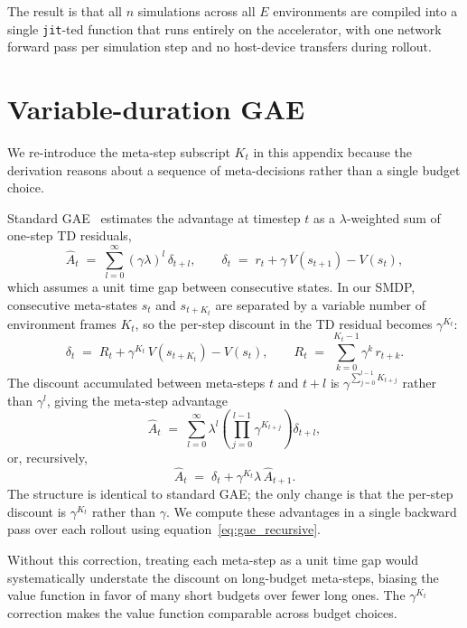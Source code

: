 \documentclass{article}
\begin{document}
The result is that all $n$ simulations across all $E$ environments are
compiled into a single \texttt{jit}-ted function that runs entirely on
the accelerator, with one network forward pass per simulation step and
no host-device transfers during rollout.

\section{Variable-duration GAE}
\label{app:gae}

We re-introduce the meta-step subscript $K_t$ in this appendix because the
derivation reasons about a sequence of meta-decisions rather than a single
budget choice.

Standard GAE~\citep{schulman2015high} estimates the advantage at
timestep $t$ as a $\lambda$-weighted sum of one-step TD residuals,
\begin{equation}
  \hat{A}_t \;=\; \sum_{l=0}^{\infty} (\gamma \lambda)^l\, \delta_{t+l},
  \qquad
  \delta_t \;=\; r_t + \gamma\, V(s_{t+1}) - V(s_t),
\end{equation}
which assumes a unit time gap between consecutive states.
In our SMDP, consecutive meta-states $s_t$ and $s_{t + K_t}$ are
separated by a variable number of environment frames $K_t$, so the
per-step discount in the TD residual becomes $\gamma^{K_t}$:
\begin{equation}
  \delta_t \;=\; R_t + \gamma^{K_t}\, V(s_{t + K_t}) - V(s_t),
  \qquad
  R_t \;=\; \sum_{k=0}^{K_t - 1} \gamma^k\, r_{t+k}.
\end{equation}
The discount accumulated between meta-steps $t$ and $t+l$ is
$\gamma^{\sum_{j=0}^{l-1} K_{t+j}}$ rather than $\gamma^l$, giving the
meta-step advantage
\begin{equation}
  \hat{A}_t
  \;=\;
  \sum_{l=0}^{\infty} \lambda^l
  \left(\prod_{j=0}^{l-1} \gamma^{K_{t+j}}\right) \delta_{t+l},
\end{equation}
or, recursively,
\begin{equation}
  \hat{A}_t \;=\; \delta_t + \gamma^{K_t} \lambda\, \hat{A}_{t+1}.
  \label{eq:gae_recursive}
\end{equation}
The structure is identical to standard GAE; the only change is that
the per-step discount is $\gamma^{K_t}$ rather than $\gamma$.
We compute these advantages in a single backward pass over each
rollout using equation~\eqref{eq:gae_recursive}.

Without this correction, treating each meta-step as a unit time gap
would systematically understate the discount on long-budget
meta-steps, biasing the value function in favor of many short budgets
over fewer long ones.
The $\gamma^{K_t}$ correction makes the value function comparable
across budget choices.
\end{document}
